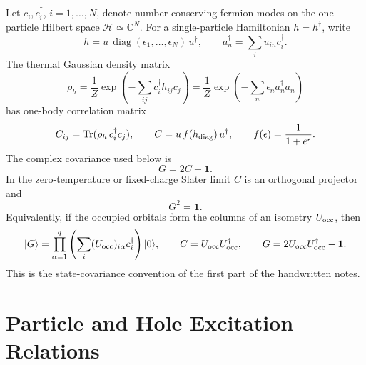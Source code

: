\documentclass[aps,prb,onecolumn,nofootinbib,superscriptaddress]{revtex4-2}
\newcommand{\I}{\mathbf{1}}
\newcommand{\Tr}{\operatorname{Tr}}
\newcommand{\diag}{\operatorname{diag}}
\newcommand{\ket}[1]{\lvert #1\rangle}
\newcommand{\cH}{\mathcal{H}}
\theoremstyle{plain}
\theoremstyle{definition}
\begin{document}
Let \(c_i,c_i^\dagger\), \(i=1,\ldots,N\), denote number-conserving fermion
modes on the one-particle Hilbert space \(\cH\simeq\mathbb C^N\).  For a
single-particle Hamiltonian \(h=h^\dagger\), write
\begin{equation}
  h=u\,\diag(\epsilon_1,\ldots,\epsilon_N)\,u^\dagger ,
  \qquad
  a_n^\dagger=\sum_i u_{in}c_i^\dagger .
  \label{eq:h-diagonalization}
\end{equation}
The thermal Gaussian density matrix
\begin{equation}
  \rho_h=\frac{1}{Z}\exp\!\left(-\sum_{ij}c_i^\dagger h_{ij}c_j\right)
  =
  \frac{1}{Z}\exp\!\left(-\sum_n\epsilon_n a_n^\dagger a_n\right)
  \label{eq:rho-h}
\end{equation}
has one-body correlation matrix
\begin{equation}
  C_{ij}=\Tr(\rho_h\,c_i^\dagger c_j),
  \qquad
  C=u\,f(h_{\rm diag})\,u^\dagger,
  \qquad
  f(\epsilon)=\frac{1}{1+e^\epsilon}.
  \label{eq:thermal-C}
\end{equation}
The complex covariance used below is
\begin{equation}
  G=2C-\I .
  \label{eq:G-convention}
\end{equation}
In the zero-temperature or fixed-charge Slater limit \(C\) is an orthogonal
projector and
\begin{equation}
  G^2=\I .
  \label{eq:pure-G}
\end{equation}
Equivalently, if the occupied orbitals form the columns of an isometry
\(U_{\rm occ}\), then
\begin{equation}
  \ket{G}
  =
  \prod_{\alpha=1}^{q}
  \left(\sum_i (U_{\rm occ})_{i\alpha}c_i^\dagger\right)\ket{0},
  \qquad
  C=U_{\rm occ}U_{\rm occ}^\dagger,
  \qquad
  G=2U_{\rm occ}U_{\rm occ}^\dagger-\I .
  \label{eq:slater-G}
\end{equation}
This is the state-covariance convention of the first part of the handwritten
notes.

\section{Particle and Hole Excitation Relations}
\end{document}
